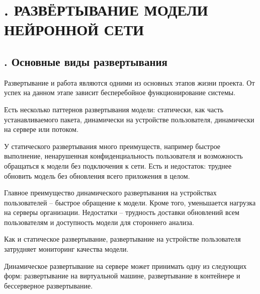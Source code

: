 \setcounter{chaptercntr}{5}

\sectionbreak \section*{
	\gostTitleFont
	\redline
	\thechaptercntr . 
	РАЗВЁРТЫВАНИЕ МОДЕЛИ НЕЙРОННОЙ СЕТИ
}

\titlespace

\subsection*{ 
	\gostTitleFont
	\redline
	\thechaptercntr .\thesubchaptercntr \spc
	Основные виды развертывания
} \addtocounter{subchaptercntr}{1}

\subtitlespace

{\gostFont
	
	\par \redline Развертывание и работа являются одними из основных этапов жизни проекта. От успех на данном этапе зависит бесперебойное функционирование системы.
	
	\par \redline Есть несколько паттернов развертывания модели: статически, как часть устанавливаемого пакета, динамически на устройстве пользователя, динамически на сервере или потоком.
	
	\par \redline У статического развертывания много преимуществ, например быстрое выполнение, ненарушенная конфиденциальность пользователя и возможность
	обращаться к модели без подключения к сети. Есть и недостаток: труднее
	обновить модель без обновления всего приложения в целом.
	
	\par \redline Главное преимущество динамического развертывания на устройствах
	пользователей – быстрое обращение к модели. Кроме того, уменьшается
	нагрузка на серверы организации. Недостатки – трудность доставки обновлений всем пользователям и доступность модели для стороннего анализа.
	
	\par \redline Как и статическое развертывание, развертывание на устройстве пользователя затрудняет мониторинг качества модели.
	
	\par \redline Динамическое развертывание на сервере может принимать одну из следующих форм: развертывание на виртуальной машине, развертывание в контейнере и бессерверное развертывание.
	
}
